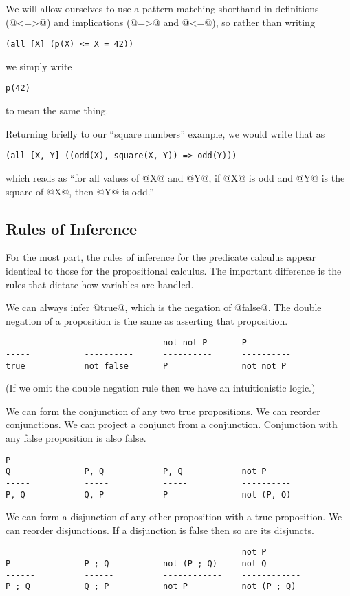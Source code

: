 \begin{itemize}
We will allow ourselves to use a pattern matching shorthand in
definitions (@<=>@) and implications (@=>@ and @<=@), so rather than
writing
\begin{verbatim}
(all [X] (p(X) <= X = 42))
\end{verbatim}
we simply write
\begin{verbatim}
p(42)
\end{verbatim}
to mean the same thing.

Returning briefly to our ``square numbers'' example, we would write that
as
\begin{verbatim}
(all [X, Y] ((odd(X), square(X, Y)) => odd(Y)))
\end{verbatim}
which reads as ``for all values of @X@ and @Y@, if @X@ is odd and @Y@ is
the square of @X@, then @Y@ is odd.''

\subsection{Rules of Inference}

For the most part, the rules of inference for the predicate calculus
appear identical to those for the propositional calculus.  The important
difference is the rules that dictate how variables are handled.

We can always infer @true@, which is the negation of @false@.
The double negation of a proposition is the same as asserting that
proposition.
\begin{verbatim}
                                not not P       P
-----           ----------      ----------      ----------
true            not false       P               not not P
\end{verbatim}
(If we omit the double negation rule then we have an intuitionistic
logic.)

We can form the conjunction of any two true propositions.
We can reorder conjunctions.
We can project a conjunct from a conjunction.
Conjunction with any false proposition is also false.
\begin{verbatim}
P
Q               P, Q            P, Q            not P
-----           -----           -----           ----------
P, Q            Q, P            P               not (P, Q)
\end{verbatim}

We can form a disjunction of any other proposition with a true
proposition.
We can reorder disjunctions.
If a disjunction is false then so are its disjuncts.
\begin{verbatim}
                                                not P
P               P ; Q           not (P ; Q)     not Q
------          ------          ------------    ------------
P ; Q           Q ; P           not P           not (P ; Q)
\end{verbatim}


\end{itemize}
